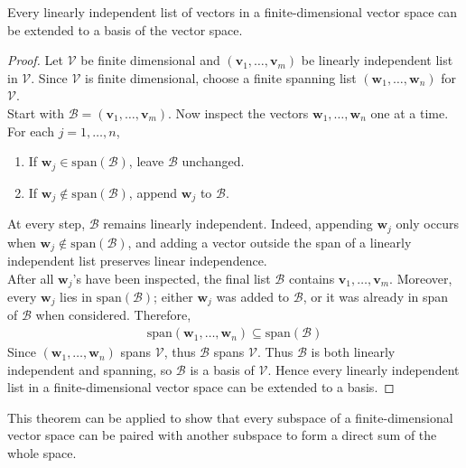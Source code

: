\begin{theorem} \label{thm:linerlyindeplistoffimdimspaceextend} Every linearly independent list of vectors in a finite-dimensional vector space can be extended to a basis of the vector space.
\begin{proof} Let $\mathcal{V}$ be finite dimensional and $(\mathbf{v}_1, \ldots, \mathbf{v}_m)$ be linearly independent list in $\mathcal{V}$. Since $\mathcal{V}$ is finite dimensional, choose a finite spanning list $(\mathbf{w}_1, \ldots, \mathbf{w}_n)$ for $\mathcal{V}$.\\
Start with $\mathcal{B} = (\mathbf{v}_1, \ldots, \mathbf{v}_m)$. Now inspect the vectors $\mathbf{w}_1, \ldots, \mathbf{w}_n$ one at a time. For each $j = 1, \ldots, n$,
\begin{enumerate}[label=\roman*.]
\setlength{\itemsep}{0pt}
\item If $\mathbf{w}_j \in \text{span}(\mathcal{B})$, leave $\mathcal{B}$ unchanged.
\item If $\mathbf{w}_j \notin \text{span}(\mathcal{B})$, append $\mathbf{w}_j$ to $\mathcal{B}$.
\end{enumerate}
At every step, $\mathcal{B}$ remains linearly independent. Indeed, appending $\mathbf{w}_j$ only occurs when $\mathbf{w}_j \notin \text{span}(\mathcal{B})$, and adding a vector outside the span of a linearly independent list preserves linear independence.\\
After all $\mathbf{w}_j$'s have been inspected, the final list $\mathcal{B}$ contains $\mathbf{v}_1, \ldots, \mathbf{v}_m$. Moreover, every $\mathbf{w}_j$ lies in $\text{span}(\mathcal{B})$; either $\mathbf{w}_j$ was added to $\mathcal{B}$, or it was already in span of $\mathcal{B}$ when considered. Therefore, 
\begin{align}
\text{span}(\mathbf{w}_1, \ldots, \mathbf{w}_n) \subseteq \text{span}(\mathcal{B}) \nonumber
\end{align}
Since $(\mathbf{w}_1, \ldots, \mathbf{w}_n)$ spans $\mathcal{V}$, thus $\mathcal{B}$ spans $\mathcal{V}$. Thus $\mathcal{B}$ is both linearly independent and spanning, so $\mathcal{B}$ is a basis of $\mathcal{V}$. Hence every linearly independent list in a finite-dimensional vector space can be extended to a basis.
\end{proof}
\end{theorem}

This theorem can be applied to show that every subspace of a finite-dimensional vector space can be paired with another subspace to form a direct sum of the whole space.

